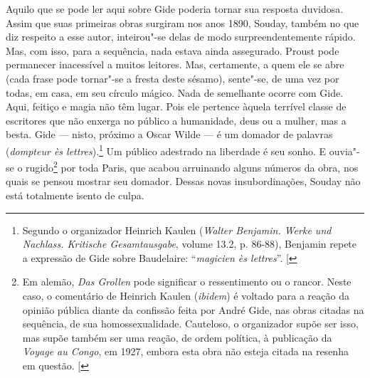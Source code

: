 Aquilo que se pode ler aqui sobre Gide poderia tornar sua resposta
duvidosa. Assim que suas primeiras obras surgiram nos anos 1890, Souday,
também no que diz respeito a esse autor, inteirou"-se delas de modo
surpreendentemente rápido. Mas, com isso, para a sequência, nada estava
ainda assegurado. Proust pode permanecer inacessível a muitos leitores.
Mas, certamente, a quem ele se abre (cada frase pode tornar"-se a fresta
deste sésamo), sente"-se, de uma vez por todas, em casa, em seu círculo
mágico. Nada de semelhante ocorre com Gide. Aqui, feitiço e magia não
têm lugar. Pois ele pertence àquela terrível classe de escritores que
não enxerga no público a humanidade, deus ou a mulher, mas a besta. Gide
--- nisto, próximo a Oscar Wilde --- é um domador de palavras
(\emph{dompteur ès lettres}).\footnote{Segundo o organizador Heinrich
  Kaulen (\emph{Walter Benjamin. Werke und Nachlass. Kritische
  Gesamtausgabe}, volume 13.2, p. 86-88), Benjamin repete a expressão de
  Gide sobre Baudelaire: ``\emph{magicien ès lettres}''. {[}\versal{N. E.}{]}} %
Um público adestrado na liberdade é seu sonho. E ouvia"-se o
rugido\footnote{Em alemão, \emph{Das Grollen} pode significar o
  ressentimento ou o rancor. Neste caso, o comentário de Heinrich Kaulen
  (\emph{ibidem}) é voltado para a reação da opinião pública diante da
  confissão feita por André Gide, nas obras citadas na sequência, de sua
  homossexualidade. Cauteloso, o organizador supõe ser isso, mas supõe
  também ser uma reação, de ordem política, à publicação da \emph{Voyage
  au Congo}, em 1927, embora esta obra não esteja citada na resenha em
  questão. {[}\versal{N. E.}{]}} por toda Paris, que acabou arruinando alguns
números da obra, nos quais se pensou mostrar seu domador. Dessas novas
insubordinações, Souday não está totalmente isento de culpa.

